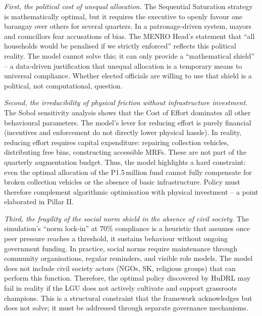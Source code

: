 \emph{First, the political cost of unequal allocation.} The Sequential Saturation strategy is mathematically optimal, but it requires the executive to openly favour one barangay over others for several quarters. In a patronage‑driven system, mayors and councillors fear accusations of bias. The MENRO Head’s statement that “all households would be penalised if we strictly enforced” reflects this political reality. The model cannot solve this; it can only provide a “mathematical shield” – a data‑driven justification that unequal allocation is a temporary means to universal compliance. Whether elected officials are willing to use that shield is a political, not computational, question.

\emph{Second, the irreducibility of physical friction without infrastructure investment.} The Sobol sensitivity analysis shows that the Cost of Effort dominates all other behavioural parameters. The model’s lever for reducing effort is purely financial (incentives and enforcement do not directly lower physical hassle). In reality, reducing effort requires capital expenditure: repairing collection vehicles, distributing free bins, constructing accessible MRFs. These are not part of the quarterly augmentation budget. Thus, the model highlights a hard constraint: even the optimal allocation of the P1.5 million fund cannot fully compensate for broken collection vehicles or the absence of basic infrastructure. Policy must therefore complement algorithmic optimisation with physical investment – a point elaborated in Pillar II.

\emph{Third, the fragility of the social norm shield in the absence of civil society.} The simulation’s “norm lock‑in” at \(70\%\) compliance is a heuristic that assumes once peer pressure reaches a threshold, it sustains behaviour without ongoing government funding. In practice, social norms require maintenance through community organisations, regular reminders, and visible role models. The model does not include civil society actors (NGOs, SK, religious groups) that can perform this function. Therefore, the optimal policy discovered by HuDRL may fail in reality if the LGU does not actively cultivate and support grassroots champions. This is a structural constraint that the framework acknowledges but does not solve; it must be addressed through separate governance mechanisms.

